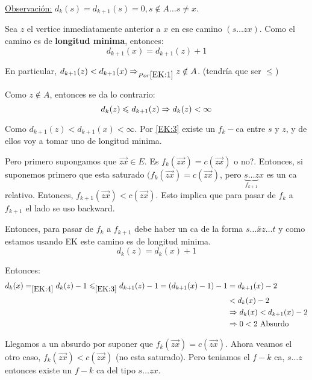 \documentclass[12pt,a4paper]{article}
\begin{document}
\underline{Observación:} $d_{k}(s) = d_{k+1}(s) = 0, s\notin A \ldots s \neq x$.
\medskip

Sea $z$ el vertice inmediatamente anterior a $x$ en ese camino $(s\ldots zx)$. 
Como el camino es de \textbf{longitud minima}, entonces:
\begin{equation}
    d_{k+1}(x) = d_{k+1}(z) + 1
    \label{EK:2}
\end{equation}

En particular, $d_{k+1}(z) < d_{k+1}(x) \Rightarrow_{Por \eqref{EK:1}} z \notin A$. 
(tendría que ser $\leq$)
\medskip

Como $z \notin A$, entonces se da lo contrario:
\begin{equation}
    d_{k}(z) \leqslant d_{k+1}(z) \Rightarrow d_{k}(z) < \infty
    \label{EK:3}
\end{equation}

Como $d_{k+1}(z) < d_{k+1}(x) < \infty$. Por \eqref{EK:3} existe un $f_{k}-$ca 
entre $s$ y $z$, y de ellos voy a tomar uno de longitud minima.
\medskip

Pero primero supongamos que $\overrightarrow{zx} \in E$. Es $f_{k}(\overrightarrow{zx}) = c(\overrightarrow{zx})$ o no?.
Entonces, si suponemos primero que esta saturado $(f_{k}(\overrightarrow{zx}) = c(\overrightarrow{zx})$, 
pero $\underbrace{s\ldots z}_{f_{k+1}}x$ es un ca relativo. Entonces, $f_{k+1}(\overrightarrow{zx}) < c(\overrightarrow{zx})$.
Esto implica que para pasar de $f_{k}$ a $f_{k+1}$ el lado se uso backward.
\medskip

Entonces, para pasar de $f_{k}$ a $f_{k+1}$ debe haber un ca de la forma 
$s \ldots \overleftarrow{xz} \ldots t$ y como estamos usando EK este camino es de 
longitud minima.
\begin{equation}
    d_{k}(z) = d_{k}(x) + 1
    \label{EK:4}
\end{equation}

Entonces:
\begin{align*}
    d_{k}(x) =_{\eqref{EK:4}} d_{k}(z)-1 \leqslant _{\eqref{EK:3}} d_{k+1}(z) -1 = (d_{k+1}(x)-1)-1 &= d_{k+1}(x) -2\\
    &<d_{k}(x) -2\\
    &\Rightarrow d_{k}(x) < d_{k+1}(x)-2 \\
    &\Rightarrow 0 < 2 \,\,\text{Absurdo}
\end{align*}

Llegamos a un absurdo por suponer que $f_{k}(\overrightarrow{zx}) = c(\overrightarrow{zx})$. 
Ahora veamos el otro caso, $f_{k}(\overrightarrow{zx}) < c(\overrightarrow{zx})$ (no esta saturado).
Pero teniamos el $f-k$ ca, $s \ldots z$ entonces existe un $f-k$ ca del tipo $s\ldots zx$.
\medskip
\end{document}
